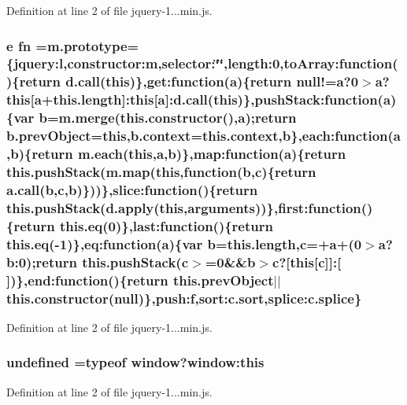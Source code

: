 Definition at line 2 of file jquery-\/1...\+min.\+js.

\subsubsection[{\texorpdfstring{fn}{fn}}]{ {\bf e} fn ={\bf m.\+prototype}=\{jquery\+:l,constructor\+:m,selector\+:\char`\"{}\char`\"{},length\+:0,to\+Array\+:function()\{return {\bf d.\+call}({\bf this})\},get\+:function({\bf a})\{return null!={\bf a}?0$>${\bf a}?{\bf this}\mbox{[}{\bf a}+this.\+length\mbox{]}\+:{\bf this}\mbox{[}{\bf a}\mbox{]}\+:{\bf d.\+call}({\bf this})\},push\+Stack\+:function({\bf a})\{var {\bf b}={\bf m.\+merge}(this.\+constructor(),{\bf a});return b.\+prev\+Object={\bf this},b.\+context=this.\+context,{\bf b}\},each\+:function({\bf a},{\bf b})\{return {\bf m.\+each}({\bf this},{\bf a},{\bf b})\},map\+:function({\bf a})\{return this.\+push\+Stack(m.\+map({\bf this},function({\bf b},{\bf c})\{return {\bf a.\+call}({\bf b},{\bf c},{\bf b})\}))\},slice\+:function()\{return this.\+push\+Stack(d.\+apply({\bf this},arguments))\},first\+:function()\{return this.\+eq(0)\},last\+:function()\{return this.\+eq(-\/1)\},eq\+:function({\bf a})\{var {\bf b}=this.\+length,{\bf c}=+{\bf a}+(0$>${\bf a}?b\+:0);return this.\+push\+Stack({\bf c}$>$=0\&\&{\bf b}$>${\bf c}?\mbox{[}{\bf this}\mbox{[}{\bf c}\mbox{]}\mbox{]}\+:\mbox{[}$\,$\mbox{]})\},end\+:function()\{return this.\+prev\+Object$\vert$$\vert$this.\+constructor(null)\},push\+:f,sort\+:c.\+sort,{\bf splice\+:c.\+splice}\}}\hypertarget{jquery-1_811_81_8min_8js_a7f8be26eb67aaeeb283f8fbb61c6761b}{}\label{jquery-1_811_81_8min_8js_a7f8be26eb67aaeeb283f8fbb61c6761b}


Definition at line 2 of file jquery-\/1...\+min.\+js.

\subsubsection[{\texorpdfstring{undefined}{undefined}}]{\setlength{\rightskip}{0pt plus 5cm}undefined =typeof window?window\+:this}\hypertarget{jquery-1_811_81_8min_8js_ae21cc36bf0d65014c717a481a3f8a468}{}\label{jquery-1_811_81_8min_8js_ae21cc36bf0d65014c717a481a3f8a468}


Definition at line 2 of file jquery-\/1...\+min.\+js.

